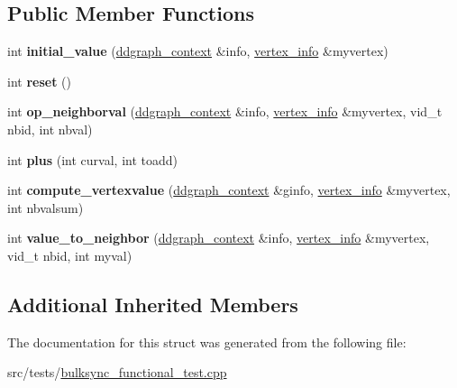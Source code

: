 \subsection*{Public Member Functions}
\begin{DoxyCompactItemize}
\item 
\hypertarget{structsmoketest__program_acb582a99fa69ac88aaa313a20a2c314d}{int {\bfseries initial\-\_\-value} (\hyperlink{structddgraph_1_1ddgraph__context}{ddgraph\-\_\-context} \&info, \hyperlink{structddgraph_1_1vertex__info}{vertex\-\_\-info} \&myvertex)}\label{structsmoketest__program_acb582a99fa69ac88aaa313a20a2c314d}

\item 
\hypertarget{structsmoketest__program_ac47d83f5770d0ec72564cc62fc7d1d15}{int {\bfseries reset} ()}\label{structsmoketest__program_ac47d83f5770d0ec72564cc62fc7d1d15}

\item 
\hypertarget{structsmoketest__program_a3070fe1597ee025bda42a7b267dcf7a9}{int {\bfseries op\-\_\-neighborval} (\hyperlink{structddgraph_1_1ddgraph__context}{ddgraph\-\_\-context} \&info, \hyperlink{structddgraph_1_1vertex__info}{vertex\-\_\-info} \&myvertex, vid\-\_\-t nbid, int nbval)}\label{structsmoketest__program_a3070fe1597ee025bda42a7b267dcf7a9}

\item 
\hypertarget{structsmoketest__program_a58cf0d408d898777245c416973fb5544}{int {\bfseries plus} (int curval, int toadd)}\label{structsmoketest__program_a58cf0d408d898777245c416973fb5544}

\item 
\hypertarget{structsmoketest__program_a28d5215603dae9bcee99b46ee9688196}{int {\bfseries compute\-\_\-vertexvalue} (\hyperlink{structddgraph_1_1ddgraph__context}{ddgraph\-\_\-context} \&ginfo, \hyperlink{structddgraph_1_1vertex__info}{vertex\-\_\-info} \&myvertex, int nbvalsum)}\label{structsmoketest__program_a28d5215603dae9bcee99b46ee9688196}

\item 
\hypertarget{structsmoketest__program_abc937e7c50885e8c9f17c5f9bf6e477e}{int {\bfseries value\-\_\-to\-\_\-neighbor} (\hyperlink{structddgraph_1_1ddgraph__context}{ddgraph\-\_\-context} \&info, \hyperlink{structddgraph_1_1vertex__info}{vertex\-\_\-info} \&myvertex, vid\-\_\-t nbid, int myval)}\label{structsmoketest__program_abc937e7c50885e8c9f17c5f9bf6e477e}

\end{DoxyCompactItemize}
\subsection*{Additional Inherited Members}


The documentation for this struct was generated from the following file\-:\begin{DoxyCompactItemize}
\item 
src/tests/\hyperlink{bulksync__functional__test_8cpp}{bulksync\-\_\-functional\-\_\-test.\-cpp}\end{DoxyCompactItemize}
